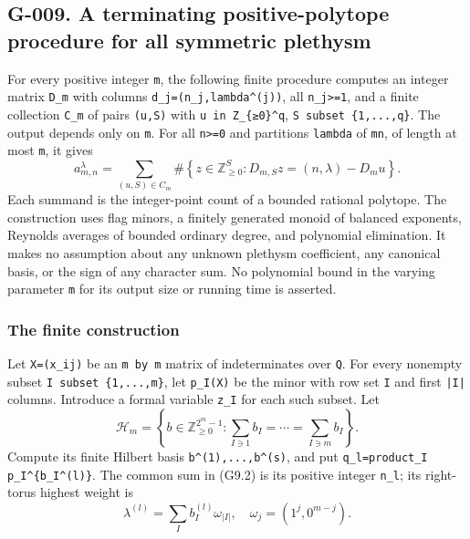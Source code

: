 \documentclass[
  10pt,
]{article}
\begin{document}
\subsection{G-009. A terminating positive-polytope procedure for all
symmetric
plethysm}\label{g-009.-a-terminating-positive-polytope-procedure-for-all-symmetric-plethysm}

For every positive integer \texttt{\small m}, the following finite
procedure computes an integer matrix \texttt{\small D\_\allowbreak{}m}
with columns
\texttt{\small d\_\allowbreak{}j=\allowbreak{}(\allowbreak{}n\_\allowbreak{}j,\allowbreak{}lambda\textasciicircum{}(\allowbreak{}j)\allowbreak{})\allowbreak{}},
all \texttt{\small n\_\allowbreak{}j>=\allowbreak{}1}, and a finite
collection \texttt{\small C\_\allowbreak{}m} of pairs
\texttt{\small (\allowbreak{}u,\allowbreak{}S)\allowbreak{}} with
\texttt{\small u in Z\_\allowbreak{}\{≥\allowbreak{}0\}\textasciicircum{}q},
\texttt{\small S subset \{1,\allowbreak{}...,\allowbreak{}q\}}. The
output depends only on \texttt{\small m}. For all
\texttt{\small n>=\allowbreak{}0} and partitions \texttt{\small lambda}
of \texttt{\small mn}, of length at most \texttt{\small m}, it gives \[
\boxed{
a_{m,n}^{\lambda}=
\sum_{(u,S)\in C_m}
\#\left\{z\in\mathbb Z_{\ge0}^{S}:
D_{m,S}z=(n,\lambda)-D_m u\right\}.
}
\tag{G9.1}
\] Each summand is the integer-point count of a bounded rational
polytope. The construction uses flag minors, a finitely generated monoid
of balanced exponents, Reynolds averages of bounded ordinary degree, and
polynomial elimination. It makes no assumption about any unknown
plethysm coefficient, any canonical basis, or the sign of any character
sum. No polynomial bound in the varying parameter \texttt{\small m} for
its output size or running time is asserted.

\subsubsection{The finite construction}\label{the-finite-construction}

Let
\texttt{\small X=\allowbreak{}(\allowbreak{}x\_\allowbreak{}ij)\allowbreak{}}
be an \texttt{\small m by m} matrix of indeterminates over
\texttt{\small Q}. For every nonempty subset
\texttt{\small I subset \{1,\allowbreak{}...,\allowbreak{}m\}}, let
\texttt{\small p\_\allowbreak{}I(\allowbreak{}X)\allowbreak{}} be the
minor with row set \texttt{\small I} and first \texttt{\small |I|}
columns. Introduce a formal variable \texttt{\small z\_\allowbreak{}I}
for each such subset. Let \[
\mathcal H_m=\left\{b\in\mathbb Z_{\ge0}^{2^m-1}:
\sum_{I\ni1}b_I=\cdots=\sum_{I\ni m}b_I\right\}.
\tag{G9.2}
\] Compute its finite Hilbert basis
\texttt{\small b\textasciicircum{}(\allowbreak{}1)\allowbreak{},\allowbreak{}...,\allowbreak{}b\textasciicircum{}(\allowbreak{}s)\allowbreak{}},
and put
\texttt{\small q\_\allowbreak{}l=\allowbreak{}product\_\allowbreak{}I p\_\allowbreak{}I\textasciicircum{}\{b\_\allowbreak{}I\textasciicircum{}(\allowbreak{}l)\allowbreak{}\}}.
The common sum in (G9.2) is its positive integer
\texttt{\small n\_\allowbreak{}l}; its right-torus highest weight is \[
\lambda^{(l)}=\sum_I b_I^{(l)}\omega_{|I|},
\quad\omega_j=(1^j,0^{m-j}).
\tag{G9.3}
\]
\end{document}
